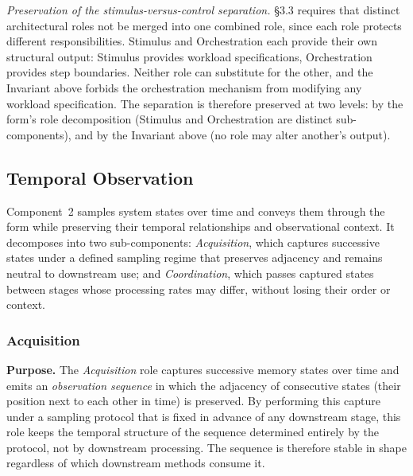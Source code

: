   \emph{Preservation of the stimulus-versus-control separation.} \S3.3 requires that distinct architectural roles not be merged into one combined role, since each role protects different responsibilities. Stimulus and Orchestration each provide their own structural output: Stimulus provides workload specifications, Orchestration provides step boundaries. Neither role can substitute for the other, and the Invariant above forbids the orchestration mechanism from modifying any workload specification. The separation is therefore preserved at two levels: by the form's role decomposition (Stimulus and Orchestration are distinct sub-components), and by the Invariant above (no role may alter another's output).

\subsection{Temporal Observation}
Component~2 samples system states over time and conveys them through the form while preserving their temporal relationships and observational context. It decomposes into two sub-components: \emph{Acquisition}, which captures successive states under a defined sampling regime that preserves adjacency and remains neutral to downstream use; and \emph{Coordination}, which passes captured states between stages whose processing rates may differ, without losing their order or context.

  \subsubsection{Acquisition}
  \textbf{Purpose.} The \emph{Acquisition} role captures successive memory states over time and emits an \emph{observation sequence} in which the adjacency of consecutive states (their position next to each other in time) is preserved. By performing this capture under a sampling protocol that is fixed in advance of any downstream stage, this role keeps the temporal structure of the sequence determined entirely by the protocol, not by downstream processing. The sequence is therefore stable in shape regardless of which downstream methods consume it.

